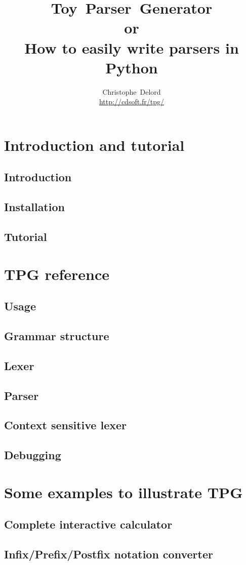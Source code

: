 \documentclass[a4paper,twoside]{report}
\author{
    Christophe~Delord\\
    \url{http://cdsoft.fr/tpg/} \\
}
\title{
    Toy~Parser~Generator \\
    or\\
    How to easily write parsers in Python \\
}
\begin{document}
\maketitle
\tableofcontents

\listoffigures

\cleardoublepage
\part{Introduction and tutorial}                            \label{tpg:intro}
    \chapter{Introduction}
        
    \chapter{Installation}
        
    \chapter{Tutorial}                                      \label{tpg:tutorial}
        

\cleardoublepage
\part{TPG reference}                                        \label{tpg:core}
    \chapter{Usage}
        
    \chapter{Grammar structure}
        
    \chapter{Lexer}
        
    \chapter{Parser}
        
    \chapter{Context sensitive lexer}                       \label{tpg:CSL}
        
    \chapter{Debugging}
        

\cleardoublepage
\part{Some examples to illustrate TPG}                      \label{tpg:examples}
    \chapter{Complete interactive calculator}
        
    \chapter{Infix/Prefix/Postfix notation converter}
        
\end{document}
